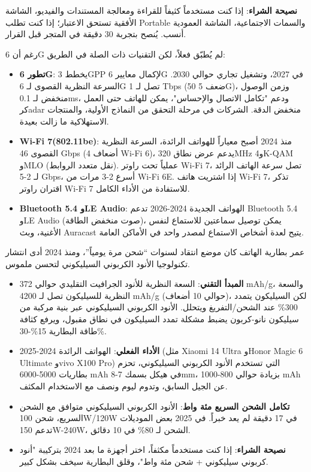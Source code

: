 \textbf{نصيحة الشراء}: إذا كنت مستخدماً كثيفاً للقراءة ومعالجة المستندات والفيديو، الشاشة الأفقية تستحق الاعتبار؛ إذا كنت تطلب Portable والسمات الاجتماعية، الشاشة العمودية أنسب. يُنصح بتجربة 30 دقيقة في المتجر قبل القرار.


رغم أن 6G لم يُطبّق فعلاً، لكن التقنيات ذات الصلة في الطريق:

\begin{itemize}
  \item \textbf{تطور 6G}: يخطط 3GPP لإكمال معايير 6G في 2027، وتشغيل تجاري حوالي 2030. السرعة النظرية القصوى لـ 6G تصل لـ 1 Tbps (50 ضعف 5G)، وزمن الوصول منخفض لـ 0.1ms، ودعم "تكامل الاتصال والإحساس"، يمكن للهاتف حتى العمل كرadar منخفض الدقة. الشركات في مرحلة التحقق من النماذج الأولية، والمنتجات الاستهلاكية ما زالت بعيدة.
  \item \textbf{Wi-Fi 7(802.11be)}: منذ 2024 أصبح معياراً للهواتف الرائدة، السرعة النظرية القصوى 46 Gbps (4 أضعاف Wi-Fi 6)، يدعم عرض نطاق 320MHz و4K-QAM وMLO (نقل متعدد الروابط). عملياً تحت راوتر Wi-Fi 7، تصل سرعة الهاتف الرائد لـ 2-5 Gbps، أسرع 2-3 مرات من Wi-Fi 6E. إذا اشتريت هاتف Wi-Fi 7، تذكر اقتران راوتر Wi-Fi 7 للاستفادة من الأداء الكامل.
  \item \textbf{Bluetooth 5.4 وLE Audio}: الهواتف الجديدة 2024-2026 تدعم Bluetooth 5.4 وLE Audio (صوت منخفض الطاقة)، يمكن توصيل سماعتين للاستماع لنفس الأغنية، وبث Auracast يتيح لعدة أشخاص الاستماع لمصدر واحد في الأماكن العامة.
\end{itemize}


عمر بطارية الهاتف كان موضع انتقاد لسنوات “شحن مرة يومياً”، ومنذ 2024 أدى انتشار تكنولوجيا الأنود الكربوني السيليكوني لتحسن ملموس.

\begin{itemize}
  \item \textbf{المبدأ التقني}: السعة النظرية للأنود الجرافيت التقليدي حوالي 372 mAh/g، والسعة النظرية للسيليكون تصل لـ 4200 mAh/g (حوالي 10 أضعاف)، لكن السيليكون يتمدد 300\% عند الشحن/التفريغ ويتحلل. الأنود الكربوني السيليكوني عبر بنية مركبة من سيليكون نانو-كربون يضبط مشكلة تمدد السيليكون في نطاق مقبول، ويرفع كثافة طاقة البطارية 15\%-30\%.
  \item \textbf{الأداء الفعلي}: الهواتف الرائدة 2024-2025 (مثل Xiaomi 14 Ultra وHonor Magic 6 Ultimate وvivo X100 Pro) التي تستخدم الأنود الكربوني السيليكوني، تحزم بطاريات 5000-6000 mAh في هيكل بسمك 7-8mm، بزيادة حوالي 800-1000 mAh عن الجيل السابق، وتدوم ليوم ونصف مع الاستخدام المكثف.
  \item \textbf{تكامل الشحن السريع مئة واط}: الأنود الكربوني السيليكوني متوافق مع الشحن السريع، شحن 100W/120W في 17 دقيقة لم يعد خبراً. في 2025 بعض الموديلات تدعم 150W-240W، الشحن لـ 80\% في 10 دقائق.
  \item \textbf{نصيحة الشراء}: إذا كنت مستخدماً مكثفاً، اختر أجهزة ما بعد 2024 بتركيبة "أنود كربوني سيليكوني + شحن مئة واط"، وقلق البطارية سيخف بشكل كبير.
\end{itemize}

